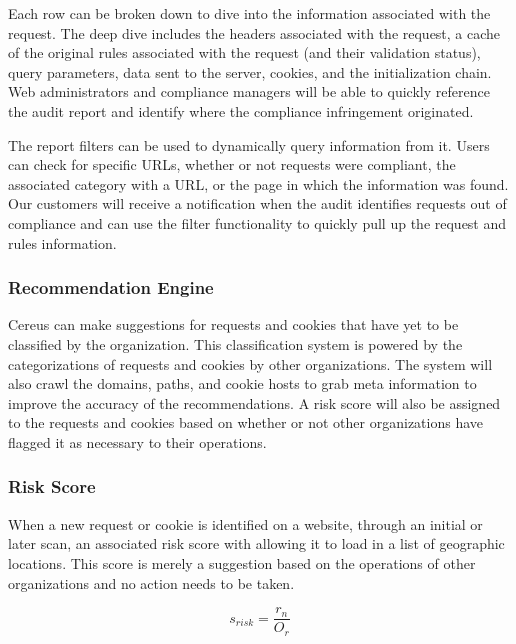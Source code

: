 Each row can be broken down to dive into the information associated with the request. The deep dive includes the headers associated with the request, a cache of the original rules associated with the request (and their validation status), query parameters, data sent to the server, cookies, and the initialization chain. Web administrators and compliance managers will be able to quickly reference the audit report and identify where the compliance infringement originated.


The report filters can be used to dynamically query information from it. Users can check for specific URLs, whether or not requests were compliant, the associated category with a URL, or the page in which the information was found. Our customers will receive a notification when the audit identifies requests out of compliance and can use the filter functionality to quickly pull up the request and rules information. 

\subsubsection{Recommendation Engine}

Cereus can make suggestions for requests and cookies that have yet to be classified by the organization. This classification system is powered by the categorizations of requests and cookies by other organizations. The system will also crawl the domains, paths, and cookie hosts to grab meta information to improve the accuracy of the recommendations. A risk score will also be assigned to the requests and cookies based on whether or not other organizations have flagged it as necessary to their operations.

\subsubsection*{Risk Score}

When a new request or cookie is identified on a website, through an initial or later scan, an associated risk score with allowing it to load in a list of geographic locations. This score is merely a suggestion based on the operations of other organizations and no action needs to be taken.

\[ s_{risk} = \frac{r_n}{O_r} \]

